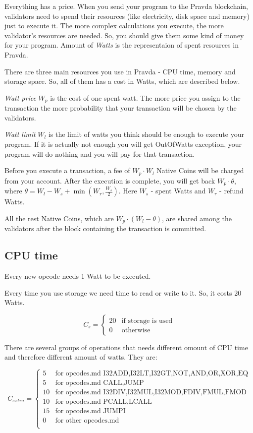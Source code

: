 \documentclass[12pt,a4paper]{article}
\begin{document}
Everything has a price. When you send your program to the Pravda blockchain, validators need to spend their resources (like electricity, disk space and memory) just to execute it. The more complex calculations you execute, the more validator's resources are needed. So, you should give them some kind of money for your program. Amount of \emph{Watts} is the representaion of spent resources in Pravda.

There are three main resources you use in Pravda - CPU time, memory and storage space. So, all of them has a cost in Watts, which are described below.

\emph{Watt price} $W_p$ is the cost of one spent watt. The more price you assign to the transaction the more probability that your transaction will be chosen by the validators.

\emph{Watt limit} $W_l$ is the limit of watts you think should be enough to execute your program. If it is actually not enough you will get OutOfWatts exception, your program will do nothing and you will pay for that transaction.

Before you execute a transaction, a fee of $W_p \cdot W_l$ Native Coins will be charged from your account. After the execution is complete, you will get back $W_p \cdot \theta$, where $\theta = W_l - W_s + \min(W_r, \frac{W_s}{2})$. Here $W_s$ - spent Watts and $W_r$ - refund Watts. 

All the rest Native Coins, which are $W_p \cdot (W_l - \theta)$, are shared among the validators after the block containing the transaction is committed.

\subsection{CPU time}

Every new opcode needs 1 Watt to be executed.

Every time you use storage we need time to read or write to it. So, it costs 20 Watts.

$$
C_s = \begin{cases} 
	20 & \text{if storage is used} \\
	0  & \text{otherwise}
	\end{cases}
$$


There are several groups of operations that needs different omount of CPU time and therefore different amount of watts. They are:

$$
C_{extra} = \begin{cases} 
			5 & \text{for opcodes.md I32ADD,I32LT,I32GT,NOT,AND,OR,XOR,EQ} \\ %
			5 & \text{for opcodes.md CALL,JUMP} \\ %
			10 & \text{for opcodes.md I32DIV,I32MUL,I32MOD,FDIV,FMUL,FMOD} \\ %
			10 & \text{for opcodes.md PCALL,LCALL} \\ %
			15 & \text{for opcodes.md JUMPI} \\
			0 & \text{for other opcodes.md} \\
			\end{cases}
$$
\end{document}
